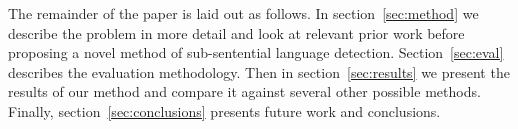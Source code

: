 \documentclass[11pt]{article}
\begin{document}
The remainder of the paper is laid out as follows. In section~\ref{sec:method} we describe the problem
in more detail and look at relevant prior work before proposing a novel method of sub-sentential
language detection. Section~\ref{sec:eval} describes the evaluation methodology. Then in section~\ref{sec:results}
we present the results of our method and compare it against several other possible methods. Finally, section~\ref{sec:conclusions}
presents future work and conclusions.


\end{document}
